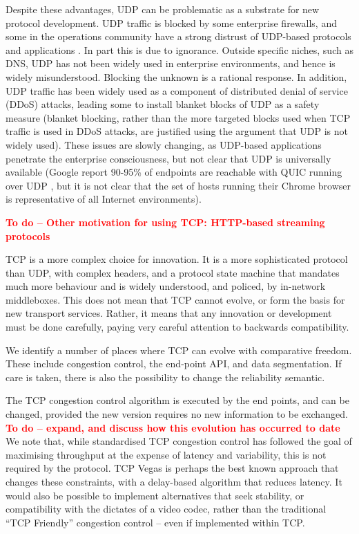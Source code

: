 \documentclass[10pt]{sig-alternate-05-2015}
\newcommand{\todo}[1]{\textbf{\textcolor{red}{To do -- #1}}}
\begin{document}
Despite these advantages, UDP can be problematic as a substrate for new
protocol development. UDP traffic is blocked by some enterprise firewalls,
and some in the operations community have a strong distrust of UDP-based
protocols and applications \cite{draft-byrne-opsec-udp-advisory-00}. In
part this is due to ignorance. Outside specific niches, such as DNS, UDP
has not been widely used in enterprise environments, and hence is widely
misunderstood. Blocking the unknown is a rational response. In addition,
UDP traffic has been widely used as a component of distributed denial of
service (DDoS) attacks, leading some to install blanket blocks of UDP as
a safety measure (blanket blocking, rather than the more targeted blocks
used when TCP traffic is used in DDoS attacks, are justified using the
argument that UDP is not widely used).
These issues are slowly changing, as UDP-based applications penetrate the
enterprise consciousness, but not clear that UDP is universally available
(Google report 90-95\% of endpoints are reachable with QUIC
running over UDP \cite{roskind2013quic}, but it is not clear that the set
of hosts running their Chrome browser is representative of all Internet
environments).

\todo{Other motivation for using TCP: HTTP-based streaming protocols}

TCP is a more complex choice for innovation. It is a more sophisticated
protocol than UDP, with complex headers, and a protocol state machine
that mandates much more behaviour and is widely understood, and policed,
by in-network middleboxes. This does not mean that TCP cannot evolve, or
form the basis for new transport services. Rather, it means that any
innovation or development must be done carefully, paying very careful
attention to backwards compatibility.

We identify a number of places where TCP can evolve with comparative
freedom. These include congestion control, the end-point API, and data
segmentation. If care is taken, there is also the possibility to change
the reliability semantic.

The TCP congestion control algorithm is executed by the end points, and
can be changed, provided the new version requires no new information to
be exchanged.
\todo{expand, and discuss how this evolution has occurred to date}
We note that, while standardised TCP congestion control has followed the
goal of maximising throughput at the expense of latency and variability,
this is not required by the protocol. TCP Vegas \cite{brakmo:1994:tcp-vegas}
is perhaps the best known approach that changes these constraints, with a
delay-based algorithm that reduces latency. It would also be possible to
implement alternatives that seek stability, or compatibility with the
dictates of a video codec, rather than the traditional ``TCP Friendly''
congestion control -- even if implemented within TCP.
\end{document}
